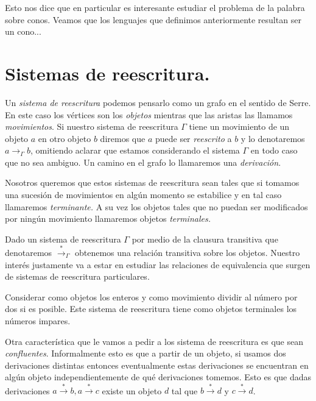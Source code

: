 \documentclass[tesis.tex]{subfiles}
\begin{document}
Esto nos dice que en particular es interesante estudiar el problema de la palabra sobre conos. Veamos que los lenguajes que definimos anteriormente resultan ser un cono...







\section{Sistemas de reescritura.}

Un \emph{sistema de reescritura} podemos pensarlo como un grafo en el sentido de Serre. En este caso los vértices son los \emph{objetos} mientras que las aristas las llamamos \emph{movimientos}.  Si nuestro sistema de reescritura $\Gamma$ tiene un movimiento de un objeto $a$ en otro objeto $b$ diremos que $a$ puede ser \emph{reescrito} a $b$ y lo denotaremos $a \to_{\Gamma} b$, omitiendo aclarar que estamos considerando el sistema $\Gamma$ en todo caso que no sea ambiguo. Un camino en el grafo lo llamaremos una \emph{derivación}.  

Nosotros queremos que estos sistemas de reescritura sean tales que si tomamos una sucesión de movimientos en algún momento se estabilice y en tal caso llamaremos \emph{terminante.} A su vez los objetos tales que no puedan ser modificados por ningún movimiento llamaremos objetos \emph{terminales.} 

Dado un sistema de reescritura $\Gamma$ por medio de la clausura transitiva que denotaremos $\overset{*}{\rightarrow}_{\Gamma}$ obtenemos una relación transitiva sobre los objetos. Nuestro interés justamente va a estar en estudiar las relaciones de equivalencia que surgen de sistemas de reescritura particulares. 

\begin{ej}
	Considerar como objetos los enteros y como movimiento dividir al número por dos si es posible. Este sistema de reescritura tiene como objetos terminales los números impares.
\end{ej}

Otra característica que le vamos a pedir a los sistema de reescritura es que sean \emph{confluentes}. Informalmente esto es que a partir de un objeto, si usamos dos derivaciones distintas entonces eventualmente estas derivaciones se encuentran en algún objeto independientemente de qué derivaciones tomemos. Esto es que dadas derivaciones $a \overset{*}{\rightarrow} b, a \overset{*}{\rightarrow} c$ existe un objeto $d$ tal que $b \overset{*}{\rightarrow} d$ y $c \overset{*}{\rightarrow} d$.
\end{document}
